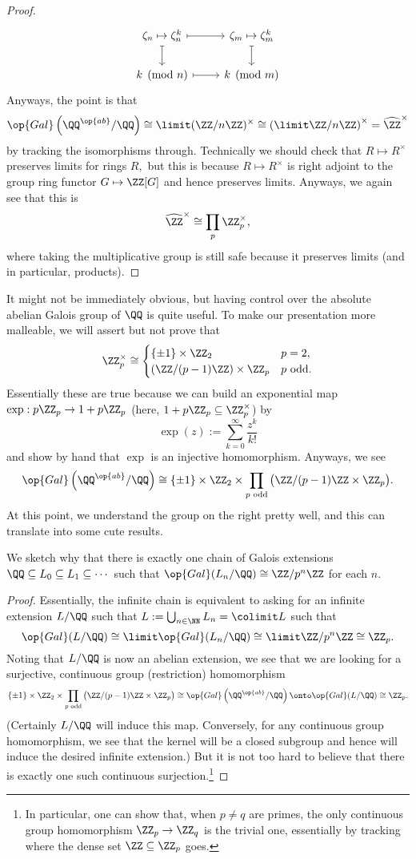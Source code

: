 \documentclass[../notes.tex]{subfiles}
\begin{document}
\begin{proof}
	\[\begin{tikzcd}
		{\zeta_n\mapsto\zeta_n^k} & {\zeta_m\mapsto\zeta_m^k} \\
		{k\pmod n} & {k\pmod m}
		\arrow[maps to, from=1-1, to=2-1]
		\arrow[maps to, from=1-1, to=1-2]
		\arrow[maps to, from=1-2, to=2-2]
		\arrow[maps to, from=2-1, to=2-2]
	\end{tikzcd}\]
	Anyways, the point is that
	\[\op{Gal}\left(\QQ^{\op{ab}}/\QQ\right)\cong\limit(\ZZ/n\ZZ)^\times\cong\left(\limit\ZZ/n\ZZ\right)^\times=\widehat{\ZZ}^\times\]
	by tracking the isomorphisms through. Technically we should check that $R\mapsto R^\times$ preserves limits for rings $R,$ but this is because $R\mapsto R^\times$ is right adjoint to the group ring functor $G\mapsto\ZZ[G]$ and hence preserves limits. Anyways, we again see that this is
	\[\widehat{\ZZ}^\times\cong\prod_p\ZZ_p^\times,\]
	where taking the multiplicative group is still safe because it preserves limits (and in particular, products).
\end{proof}
It might not be immediately obvious, but having control over the absolute abelian Galois group of $\QQ$ is quite useful. To make our presentation more malleable, we will assert but not prove that
\[\ZZ_p^\times\cong\begin{cases}
	\{\pm1\}\times\ZZ_2 & p=2, \\
	(\ZZ/(p-1)\ZZ)\times\ZZ_p & p\text{ odd}.
\end{cases}\]
Essentially these are true because we can build an exponential map $\exp:p\ZZ_p\to1+p\ZZ_p$ (here, $1+p\ZZ_p\subseteq\ZZ_p^\times$) by
\[\exp(z):=\sum_{k=0}^\infty\frac{z^k}{k!}\]
and show by hand that $\exp$ is an injective homomorphism. Anyways, we see
\[\op{Gal}\left(\QQ^{\op{ab}}/\QQ\right)\cong\{\pm1\}\times\ZZ_2\times\prod_{p\text{ odd}}\big(\ZZ/(p-1)\ZZ\times\ZZ_p\big).\]
At this point, we understand the group on the right pretty well, and this can translate into some cute results.
\begin{exe}
	We sketch why that there is exactly one chain of Galois extensions $\QQ\subseteq L_0\subseteq L_1\subseteq\cdots$ such that $\op{Gal}(L_n/\QQ)\cong\ZZ/p^n\ZZ$ for each $n.$
\end{exe}
\begin{proof}
	Essentially, the infinite chain is equivalent to asking for an infinite extension $L/\QQ$ such that $L:=\bigcup_{n\in\NN}L_n=\colimit L$ such that
	\[\op{Gal}(L/\QQ)\cong\limit\op{Gal}(L_n/\QQ)\cong\limit\ZZ/p^n\ZZ\cong\ZZ_p.\]
	Noting that $L/\QQ$ is now an abelian extension, we see that we are looking for a surjective, continuous group (restriction) homomorphism
	\[\{\pm1\}\times\ZZ_2\times\prod_{p\text{ odd}}\big(\ZZ/(p-1)\ZZ\times\ZZ_p\big)\cong\op{Gal}\left(\QQ^{\op{ab}}/\QQ\right)\onto\op{Gal}(L/\QQ)\cong\ZZ_p.\]
	(Certainly $L/\QQ$ will induce this map. Conversely, for any continuous group homomorphism, we see that the kernel will be a closed subgroup and hence will induce the desired infinite extension.) But it is not too hard to believe that there is exactly one such continuous surjection.\footnote{In particular, one can show that, when $p\ne q$ are primes, the only continuous group homomorphism $\ZZ_p\to\ZZ_q$ is the trivial one, essentially by tracking where the dense set $\ZZ\subseteq\ZZ_p$ goes.}
\end{proof}
\end{document}
